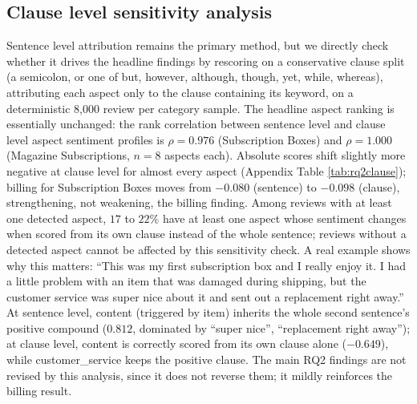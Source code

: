 \documentclass[11pt,a4paper,DIV=12]{scrartcl}
\begin{document}
\subsection{Clause level sensitivity analysis}
\label{sec:rq2-clause}
Sentence level attribution remains the primary method, but we directly check
whether it drives the headline findings by rescoring on a conservative
clause split (a semicolon, or one of but, however,
although, though, yet, while, whereas),
attributing each aspect only to the clause containing its keyword,
on a deterministic 8,000 review per category sample. The headline aspect
ranking is essentially unchanged: the rank correlation between
sentence level and clause level aspect sentiment profiles is
$\rho=0.976$ (Subscription Boxes) and $\rho=1.000$ (Magazine Subscriptions,
$n=8$ aspects each). Absolute scores shift slightly more negative at clause
level for almost every aspect (Appendix Table \ref{tab:rq2clause}); billing for
Subscription Boxes moves from $-0.080$ (sentence) to $-0.098$ (clause),
strengthening, not weakening, the billing finding. Among reviews with at
least one detected aspect, $17$ to $22\%$ have at least one aspect whose sentiment
changes when scored from its own clause instead of the whole sentence; reviews
without a detected aspect cannot be affected by this sensitivity check. A
real example shows why this matters: ``This was my first subscription box and
I really enjoy it. I had a little problem with an item that was damaged during
shipping, but the customer service was super nice about it and sent out a
replacement right away.'' At sentence level, content (triggered by
item) inherits the whole second sentence's positive compound ($0.812$,
dominated by ``super nice'', ``replacement right away''); at clause level,
content is correctly scored from its own clause alone ($-0.649$),
while customer\_service keeps the positive clause. The main RQ2
findings are not revised by this analysis, since it does not reverse them;
it mildly reinforces the billing result.
\end{document}
